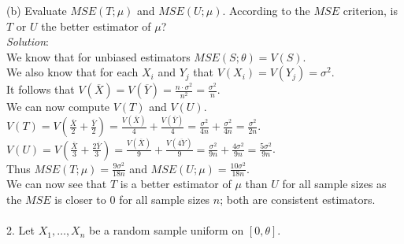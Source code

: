 \documentclass[12pt]{article}
\newcommand{\XB}{\color{black}}
\newcommand{\XBB}{\color{blue}}
\begin{document}

(b) Evaluate $ MSE(T; \mu) $ and $ MSE(U; \mu) $. According to the $ MSE $ criterion, is $ T $ or $ U $ the better estimator of $ \mu $?
\vspace{2.5mm} \\
\textit{Solution}:
\vspace{2.5mm} \\

\noindent
We know that for unbiased estimators $ MSE(S;\theta) = V(S) $. \\

\noindent
We also know that for each $ X_{i} $ and $ Y_{j} $ that $ V(X_{i}) = V(Y_{j}) = \sigma^{2} $. \\

\noindent
It follows that $ \displaystyle V(\overline{X}) = V(\overline{Y}) = \frac{n \cdot \sigma^{2}}{n^{2}} = \frac{\sigma^{2}}{n} $. \\

\noindent
We can now compute $ V(T) $ and $ V(U) $. \\

\noindent
$ \displaystyle V(T) = V(\frac{\overline{X}}{2} + \frac{\overline{Y}}{2}) = \frac{V(\overline{X})}{4} + \frac{V(\overline{Y})}{4} = \frac{\sigma^2}{4n} + \frac{\sigma^2}{4n} = \frac{\sigma^2}{2n} $. \\

\noindent
$ \displaystyle V(U) = V(\frac{\overline{X}}{3} + \frac{2\overline{Y}}{3}) = \frac{V(\overline{X})}{9} + \frac{V(\overline{4Y})}{9} = \frac{\sigma^2}{9n} + \frac{4\sigma^2}{9n} = \frac{5\sigma^2}{9n} $. \\

\noindent
Thus $ \displaystyle MSE(T; \mu) = \frac{9\sigma^2}{18n} $ and $ \displaystyle MSE(U; \mu) = \frac{10\sigma^{2}}{18n} $. \\

\noindent
We can now see that $ T $ is a better estimator of $ \mu $ than $ U $ for all sample sizes as the $ MSE $ is closer to $ 0 $ for all sample sizes $ n $; both are consistent estimators. \\

\newpage
\XBB\hrulefill\XB \\

2. Let $ X_{1},\dots,X_{n} $ be a random sample uniform on $ [0,\theta] $. 
\end{document}
